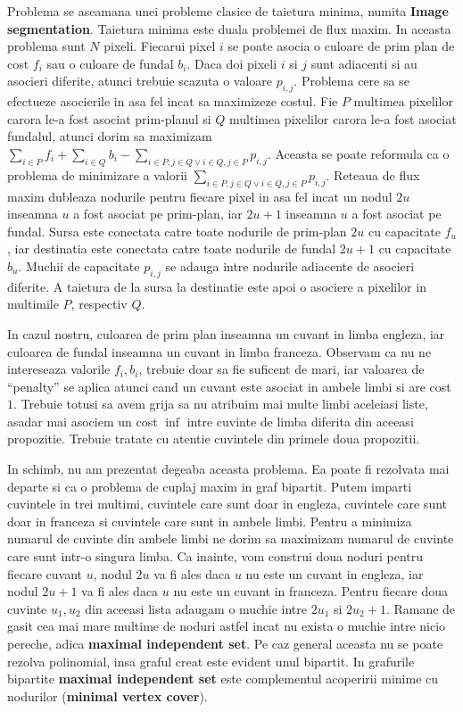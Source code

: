 Problema se aseamana unei probleme clasice de taietura minima, numita \textbf{Image segmentation}. Taietura minima este duala
problemei de flux maxim. In aceasta problema sunt $N$ pixeli. Fiecarui pixel $i$ se poate asocia o culoare de prim plan de cost
$f_{i}$ sau o culoare de fundal $b_{i}$. Daca doi pixeli $i$ si $j$ sunt adiacenti si au asocieri diferite, atunci trebuie scazuta
o valoare $p_{i,j}$. Problema cere sa se efectueze asocierile in asa fel incat sa maximizeze costul. Fie $P$ multimea pixelilor carora
le-a fost asociat prim-planul si $Q$ multimea pixelilor carora le-a fost asociat fundalul, atunci dorim sa maximizam
$\displaystyle\sum\limits_{i \in P} f_{i} + \displaystyle\sum\limits_{i \in Q} b_{i} - \displaystyle\sum\limits_{i \in P, j \in Q \lor i \in Q, j \in P} p_{i,j}$. Aceasta se poate reformula ca o problema
de minimizare a valorii $\displaystyle\sum\limits_{i \in P, j \in Q \lor i \in Q, j \in P} p_{i,j}$. Reteaua de flux maxim dubleaza nodurile pentru fiecare pixel
in asa fel incat un nodul $2u$ inseamna $u$ a fost asociat pe prim-plan, iar $2u+1$ inseamna $u$ a fost asociat pe fundal. Sursa este
conectata catre toate nodurile de prim-plan $2u$ cu capacitate $f_{u}$, iar destinatia este conectata catre toate nodurile de fundal $2u+1$
cu capacitate $b_{u}$. Muchii de capacitate $p_{i,j}$ se adauga intre nodurile adiacente de asocieri diferite. A taietura de la sursa la
destinatie este apoi o asociere a pixelilor in multimile $P$, respectiv $Q$.

In cazul nostru, culoarea de prim plan inseamna un cuvant in limba engleza, iar culoarea de fundal inseamna un cuvant in limba franceza.
Observam ca nu ne intereseaza valorile $f_{i}, b_{i}$, trebuie doar sa fie suficent de mari, iar valoarea de ``penalty'' se aplica atunci cand
un cuvant este asociat in ambele limbi si are cost $1$. Trebuie totusi sa avem grija sa nu atribuim mai multe limbi aceleiasi liste, asadar mai
asociem un cost $\inf$ intre cuvinte de limba diferita din aceeasi propozitie. Trebuie tratate cu atentie cuvintele din primele doua propozitii.

In schimb, nu am prezentat degeaba aceasta problema. Ea poate fi rezolvata mai departe si ca o problema de cuplaj maxim in graf bipartit.
Putem imparti cuvintele in trei multimi, cuvintele care sunt doar in engleza, cuvintele care sunt doar in franceza si cuvintele
care sunt in ambele limbi. Pentru a minimiza numarul de cuvinte din ambele limbi ne dorim sa maximizam numarul de cuvinte care sunt intr-o
singura limba. Ca inainte, vom construi doua noduri pentru fiecare cuvant $u$, nodul $2u$ va fi ales daca $u$ nu este un cuvant in engleza,
iar nodul $2u + 1$ va fi ales daca $u$ nu este un cuvant in franceza. Pentru fiecare doua cuvinte $u_{1}, u_{2}$ din aceeasi lista adaugam o
muchie intre $2u_{1}$ si $2u_{2} + 1$. Ramane de gasit cea mai mare multime de noduri astfel incat nu exista o muchie intre nicio pereche, adica
\textbf{maximal independent set}. Pe caz general aceasta nu se poate rezolva polinomial, insa graful creat este evident unul bipartit. In grafurile
bipartite \textbf{maximal independent set} este complementul acoperirii minime cu nodurilor (\textbf{minimal vertex cover}).

